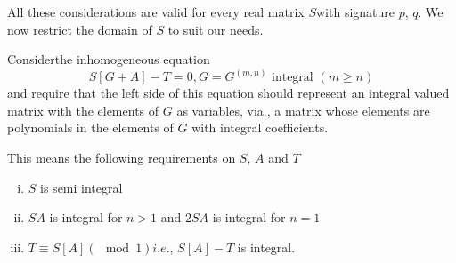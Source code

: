 All these considerations are valid for every real matrix $S$with
signature $p$, $q$. We now restrict the domain of $S$ to suit our
needs.  

Consider\pageoriginale the inhomogeneous equation 
\begin{equation*}
S[ G + A ] - T = 0 , G = G ^{(m , n)} \text{ integral } (m \geq n )
\tag{261}\label{eq261} 
\end{equation*}
and require that the left side of this equation should represent an
integral valued matrix with the elements of $G$ as variables, via., a
matrix whose elements are polynomials in the elements of $G$ with
integral coefficients.  

This means the following requirements on $S$, $A$ and $T$
\begin{enumerate}[(i)]
\item $S$ is semi integral 

\item $SA$ is integral for $n > 1$ and $2 SA$ is integral for $n = 1$

\item $T \equiv S[A] (\mod 1) i.e.$, $S[A] - T$ is integral. 
\end{enumerate}

